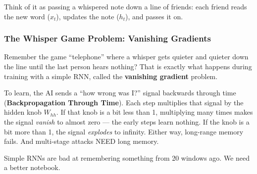 \documentclass[11pt,a4paper]{article}
\begin{document}
\begin{center}
\end{center}

Think of it as passing a whispered note down a line of friends: each friend
reads the new word ($x_t$), updates the note ($h_t$), and passes it on.

\subsubsection{The Whisper Game Problem: Vanishing Gradients}

Remember the game ``telephone'' where a whisper gets quieter and quieter down
the line until the last person hears nothing? That is exactly what happens
during training with a simple RNN, called the \textbf{vanishing gradient}
problem.

To learn, the AI sends a ``how wrong was I?'' signal backwards through time
(\textbf{Backpropagation Through Time}). Each step multiplies that signal by
the hidden knob $W_{hh}$. If that knob is a bit less than 1, multiplying many
times makes the signal \emph{vanish} to almost zero --- the early steps learn
nothing. If the knob is a bit more than 1, the signal \emph{explodes} to
infinity. Either way, long-range memory fails. And multi-stage attacks NEED
long memory.

Simple RNNs are bad at remembering something from 20 windows ago. We need a
better notebook.
\end{document}
